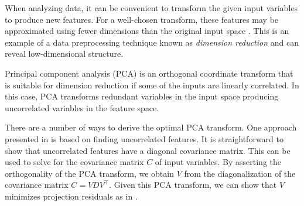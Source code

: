 When analyzing data, it can be convenient to transform the given input variables to produce new features.
For a well-chosen transform, these features may be approximated using fewer dimensions than the original input space \cite{koutroumbas2008pattern}.
This is an example of a data preprocessing technique known as \textit{dimension reduction} and can reveal low-dimensional structure.

Principal component analysis (PCA) is an orthogonal coordinate transform that is suitable for dimension reduction if some of the inputs are linearly correlated.
In this case, PCA transforms redundant variables in the input space producing uncorrelated variables in the feature space.

There are a number of ways to derive the optimal PCA transform.
One approach presented in \cite{koutroumbas2008pattern} is based on finding uncorrelated features.
It is straightforward to show that uncorrelated features have a diagonal covariance matrix.
This can be used to solve for the covariance matrix \(C\) of input variables.
By asserting the orthogonality of the PCA transform, we obtain \(V\) from the diagonalization of the covariance matrix \(C = VDV^\top\).
Given this PCA transform, we can show that \(V\) minimizes projection residuals as in \cite{shalizi2021advanced}.